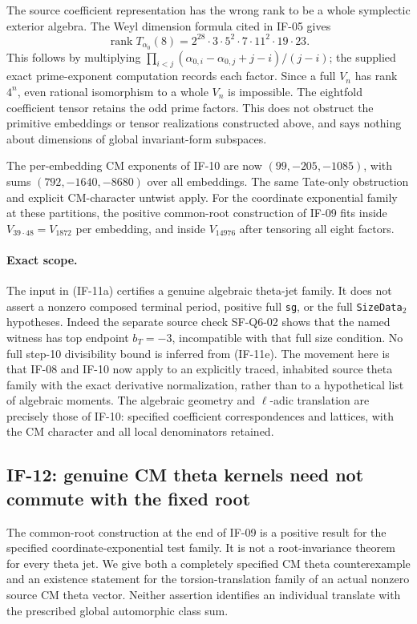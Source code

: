 \documentclass[11pt,a4paper]{article}
\theoremstyle{definition}
\theoremstyle{remark}
\begin{document}
The source coefficient representation has the wrong rank to be a
whole symplectic exterior algebra. The Weyl dimension
formula cited in IF-05 gives
\[
 \operatorname{rank}T_{\alpha_0}(8)
  =2^{28}\cdot3\cdot5^2\cdot7\cdot11^2\cdot19\cdot23.
                                                               \tag{IF-11h}
\]
This follows by multiplying
$\prod_{i<j}(\alpha_{0,i}-\alpha_{0,j}+j-i)/(j-i)$; the supplied
exact prime-exponent computation records each factor. Since a full
$V_n$ has rank $4^n$, even rational isomorphism to a whole $V_n$ is
impossible. The eightfold coefficient tensor retains the odd prime
factors. This does not obstruct the primitive embeddings or tensor
realizations constructed above, and says nothing about dimensions
of global invariant-form subspaces.

The per-embedding CM exponents of IF-10 are now
$(99,-205,-1085)$, with sums $(792,-1640,-8680)$ over all embeddings.
The same Tate-only obstruction and explicit CM-character untwist apply.
For the coordinate exponential family at these partitions, the positive
common-root construction of IF-09 fits inside $V_{39\cdot48}=V_{1872}$
per embedding, and inside $V_{14976}$ after tensoring all eight factors.

\paragraph{Exact scope.}
The input in (IF-11a) certifies a genuine algebraic theta-jet family.
It does not assert a nonzero composed terminal period, positive full
\texttt{sg}, or the full \texttt{SizeData}$_2$ hypotheses.
Indeed the separate source check SF-Q6-02 shows that the named witness
has top endpoint $b_T=-3$, incompatible with that full size condition.
No full step-10 divisibility bound is inferred from (IF-11e).
The movement here is that IF-08 and IF-10 now apply to an explicitly
traced, inhabited source theta family with the exact derivative
normalization, rather than to a hypothetical list of algebraic moments.
The algebraic geometry and $\ell$-adic translation are precisely those
of IF-10: specified coefficient correspondences and lattices, with the
CM character and all local denominators retained.


\subsection{IF-12: genuine CM theta kernels need not commute with the fixed root}
The common-root construction at the end of IF-09 is a positive result
for the specified coordinate-exponential test family. It is not a
root-invariance theorem for every theta jet. We give both a completely
specified CM theta counterexample and an existence statement for the
torsion-translation family of an actual nonzero source CM theta vector.
Neither assertion identifies an individual translate with the prescribed
global automorphic class sum.
\end{document}
